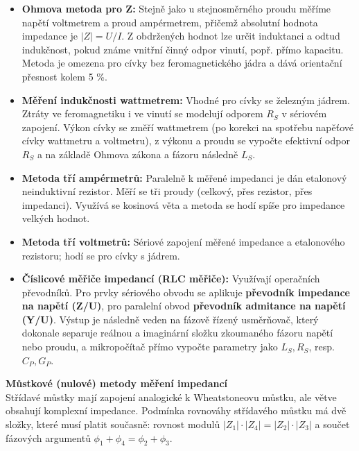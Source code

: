         \begin{itemize}
            \item \textbf{Ohmova metoda pro Z:} Stejně jako u stejnosměrného proudu měříme napětí voltmetrem a proud ampérmetrem, přičemž absolutní hodnota impedance je $|Z| = U/I$. Z obdržených hodnot lze určit induktanci a odtud indukčnost, pokud známe vnitřní činný odpor vinutí, popř. přímo kapacitu. Metoda je omezena pro cívky bez feromagnetického jádra a dává orientační přesnost kolem 5 \%.
            \item \textbf{Měření indukčnosti wattmetrem:} Vhodné pro cívky se železným jádrem. Ztráty ve feromagnetiku i ve vinutí se modelují odporem $R_S$ v sériovém zapojení. Výkon cívky se změří wattmetrem (po korekci na spotřebu napěťové cívky wattmetru a voltmetru), z výkonu a proudu se vypočte efektivní odpor $R_S$ a na základě Ohmova zákona a fázoru následně $L_S$.
            \item \textbf{Metoda tří ampérmetrů:} Paralelně k měřené impedanci je dán etalonový neinduktivní rezistor. Měří se tři proudy (celkový, přes rezistor, přes impedanci). Využívá se kosinová věta a metoda se hodí spíše pro impedance velkých hodnot.
            \item \textbf{Metoda tří voltmetrů:} Sériové zapojení měřené impedance a etalonového rezistoru; hodí se pro cívky s jádrem.
            \item \textbf{Číslicové měřiče impedancí (RLC měřiče):} Využívají operačních převodníků. Pro prvky sériového obvodu se aplikuje \textbf{převodník impedance na napětí (Z/U)}, pro paralelní obvod \textbf{převodník admitance na napětí (Y/U)}. Výstup je následně veden na fázově řízený usměrňovač, který dokonale separuje reálnou a imaginární složku zkoumaného fázoru napětí nebo proudu, a mikropočítač přímo vypočte parametry jako $L_S, R_S$, resp. $C_P, G_P$.
        \end{itemize}
        
        \textbf{Můstkové (nulové) metody měření impedancí}\\
        Střídavé můstky mají zapojení analogické k Wheatstoneovu můstku, ale větve obsahují komplexní impedance. Podmínka rovnováhy střídavého můstku má dvě složky, které musí platit současně: rovnost modulů $|Z_1| \cdot |Z_4| = |Z_2| \cdot |Z_3|$ a součet fázových argumentů $\phi_1 + \phi_4 = \phi_2 + \phi_3$.
        
